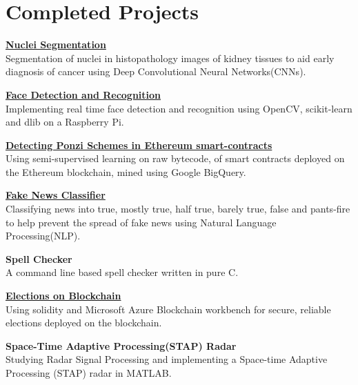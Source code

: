 \documentclass[letterpaper]{article}
\renewenvironment{itemize}{
  \begin{list}{}{
    \setlength{\leftmargin}{1.5em}
  }
}{
  \end{list}
}
\begin{document}
\section*{Completed Projects}
  \begin{itemize}
    \item
    \href{https://github.com/rshwndsz/nuclei-segmentation}{\textbf{Nuclei Segmentation}}\\
    Segmentation of nuclei in histopathology images of kidney tissues to aid early diagnosis of cancer using Deep Convolutional Neural Networks(CNNs).

    \item
    \href{https://github.com/rshwndsz/face-net}{\textbf{Face Detection and Recognition}}\\
    Implementing real time face detection and recognition using OpenCV, scikit-learn and dlib on a Raspberry Pi.

    \item
    \href{https://github.com/rshwndsz/ponzi-detector}{\textbf{Detecting Ponzi Schemes in Ethereum smart-contracts}}\\
    Using semi-supervised learning on raw bytecode, of smart contracts deployed on the Ethereum blockchain, mined using Google BigQuery.

    \item
    \href{https://github.com/rshwndsz/fake-news-classifier}{\textbf{Fake News Classifier}}\\
    Classifying news into true, mostly true, half true, barely true, false and pants-fire to help prevent the spread of fake news using Natural Language Processing(NLP).

    \item
    \textbf{Spell Checker}\\
    A command line based spell checker written in pure C.

    \item
    \href{https://github.com/rshwndsz/blockchain-elections}{\textbf{Elections on Blockchain}}\\
    Using solidity and Microsoft Azure Blockchain workbench for secure, reliable elections deployed on the blockchain.
  
    \item 
    \textbf{Space-Time Adaptive Processing(STAP) Radar}\\
    Studying Radar Signal Processing and implementing a Space-time Adaptive Processing (STAP) radar in MATLAB.
  \end{itemize}
\end{document}
